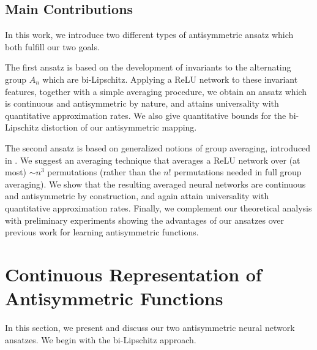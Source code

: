 \documentclass{amsart}
\theoremstyle{plain}
\theoremstyle{definition}
\theoremstyle{remark}
\begin{document}
\subsection{Main Contributions}
In this work, we introduce two different types of antisymmetric ansatz which both fulfill our two goals. 

The first ansatz is based on the development of invariants to the alternating group $A_n$ which are bi-Lipschitz. Applying a ReLU network to these invariant features, together with a simple averaging procedure, we obtain an ansatz which is continuous and antisymmetric by nature, and attains universality with quantitative approximation rates. We also give quantitative bounds for the bi-Lipschitz distortion of our antisymmetric mapping. 

The second ansatz is based on generalized notions of group averaging, introduced in \cites{puny2022frameaveraginginvariantequivariant,frames}. We suggest an averaging technique that averages a ReLU network over (at most) $\sim n^3 $ permutations (rather than the $n!$ permutations needed in full group averaging). We show that the resulting averaged neural networks are continuous and antisymmetric by construction, and again attain universality with quantitative approximation rates. 
    Finally, we complement our theoretical analysis with  preliminary experiments showing the advantages of our ansatzes over previous work for learning antisymmetric functions. 

\section{Continuous Representation of Antisymmetric Functions}
In this section, we present and discuss our two antisymmetric neural network ansatzes. We begin with the bi-Lipschitz approach. 
\end{document}
